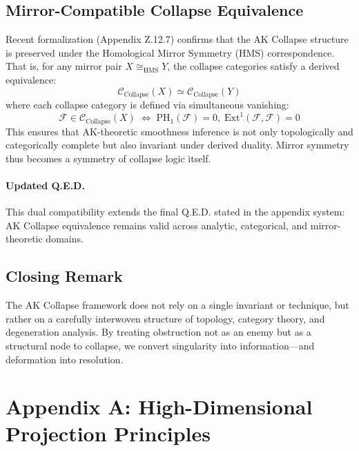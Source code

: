 \documentclass[11pt]{article}
\begin{document}
\subsection*{Mirror-Compatible Collapse Equivalence}

Recent formalization (Appendix Z.12.7) confirms that the AK Collapse structure is preserved under the Homological Mirror Symmetry (HMS) correspondence. That is, for any mirror pair \( X \cong_{\mathrm{HMS}} Y \), the collapse categories satisfy a derived equivalence:
\[
\mathcal{C}_{\text{Collapse}}(X) \simeq \mathcal{C}_{\text{Collapse}}(Y)
\]
where each collapse category is defined via simultaneous vanishing:
\[
\mathcal{F} \in \mathcal{C}_{\text{Collapse}}(X) \;\Leftrightarrow\; \mathrm{PH}_1(\mathcal{F}) = 0, \;\mathrm{Ext}^1(\mathcal{F}, \mathcal{F}) = 0
\]
This ensures that AK-theoretic smoothness inference is not only topologically and categorically complete but also invariant under derived duality. Mirror symmetry thus becomes a symmetry of collapse logic itself.

\paragraph{Updated Q.E.D.}
This dual compatibility extends the final Q.E.D. stated in the appendix system:  
AK Collapse equivalence remains valid across analytic, categorical, and mirror-theoretic domains.


\subsection*{Closing Remark}

The AK Collapse framework does not rely on a single invariant or technique, but rather on a carefully interwoven structure of topology, category theory, and degeneration analysis. By treating obstruction not as an enemy but as a structural node to collapse, we convert singularity into information—and deformation into resolution.





\section*{Appendix A: High-Dimensional Projection Principles}
\end{document}
